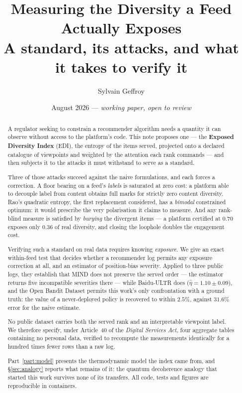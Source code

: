 \documentclass[11pt,a4paper]{article}
\title{\textbf{Measuring the Diversity a Feed Actually Exposes}\\[2mm]
       \large A standard, its attacks, and what it takes to verify it}
\author{Sylvain Geffroy}
\date{August 2026 --- \emph{working paper, open to review}}
\begin{document}
\maketitle

\begin{abstract}
\noindent
A regulator seeking to constrain a recommender algorithm needs a quantity it can observe
without access to the platform's code. This note proposes one --- the \textbf{Exposed
Diversity Index} (EDI), the entropy of the items served, projected onto a declared catalogue
of viewpoints and weighted by the attention each rank commands --- and then subjects it to the
attacks it must withstand to serve as a standard.

Three of those attacks succeed against the naive formulations, and each forces a correction. A
floor bearing on a feed's \emph{labels} is saturated at zero cost: a platform able to decouple
label from content obtains full marks for strictly zero content diversity. Rao's quadratic
entropy, the first replacement considered, has a \emph{bimodal} constrained optimum: it would
prescribe the very polarisation it claims to measure. And any rank-blind measure is satisfied
by \emph{burying} the divergent items --- a platform certified at $0.70$ exposes only $0.36$ of
real diversity, and closing the loophole doubles the engagement cost.

Verifying such a standard on real data requires knowing \emph{exposure}. We give an exact
within-feed test that decides whether a recommender log permits any exposure correction at
all, and an estimator of position-bias severity. Applied to three public logs, they establish
that MIND does not preserve the served order --- the estimator returns five incompatible
severities there --- while Baidu-ULTR does ($\hat\eta = 1.10 \pm 0.09$), and the Open Bandit
Dataset permits this work's only confrontation with a ground truth: the value of a
never-deployed policy is recovered to within $2.5\%$, against $31.6\%$ error for the naive
estimate.

No public dataset carries both the served rank and an interpretable viewpoint label. We
therefore specify, under Article~40 of the \emph{Digital Services Act}, four aggregate tables
containing no personal data, verified to recompute the measurements identically for a hundred
times fewer rows than a raw log.

Part~\ref{part:model} presents the thermodynamic model the index came from, and
\S\ref{sec:analogy} reports what remains of it: the quantum decoherence analogy that started
this work survives none of its transfers. All code, tests and figures are reproducible in
containers.
\end{abstract}
\end{document}
